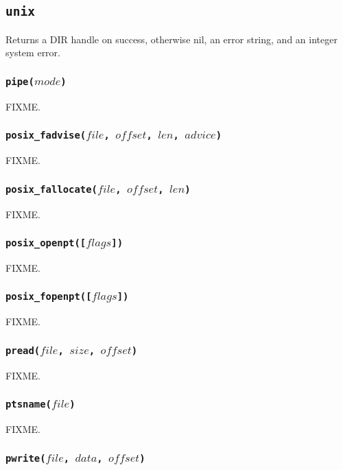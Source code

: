 \documentclass[11pt, oneside]{memoir}
\newcommand*{\fn}[1]{\texttt{#1}\xspace}
\newcounter{toccols}
\newenvironment{Module}[1]{
	\subsection{\texttt{#1}}
	\addtocontents{toc}{
		\protect\begin{multicols}{\value{toccols}}
	}
}{
	\addtocontents{toc}{\protect\end{multicols}}
}
\begin{document}
\begin{Module}{unix}
Returns a DIR handle on success, otherwise nil, an error string, and an integer system error.

\subsubsection[\fn{pipe}]{\fn{pipe($mode$)}}

FIXME.

\subsubsection[\fn{posix\_fadvise}]{\fn{posix\_fadvise($file$, $offset$, $len$, $advice$)}}

FIXME.

\subsubsection[\fn{posix\_fallocate}]{\fn{posix\_fallocate($file$, $offset$, $len$)}}

FIXME.

\subsubsection[\fn{posix\_openpt}]{\fn{posix\_openpt([$flags$])}}

FIXME.

\subsubsection[\fn{posix\_fopenpt}]{\fn{posix\_fopenpt([$flags$])}}

FIXME.

\subsubsection[\fn{pread}]{\fn{pread($file$, $size$, $offset$)}}

FIXME.

\subsubsection[\fn{ptsname}]{\fn{ptsname($file$)}}

FIXME.

\subsubsection[\fn{pwrite}]{\fn{pwrite($file$, $data$, $offset$)}}


\end{Module}
\end{document}
